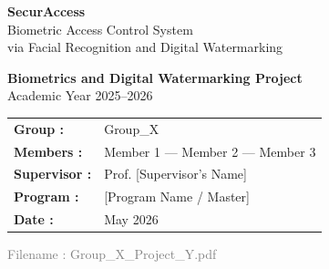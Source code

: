 \begin{titlepage}
    \centering
    \vspace*{1cm}

    {\Huge\bfseries\textcolor{mainblue}{SecurAccess}}\\[0.4cm]
    {\LARGE Biometric Access Control System\\via Facial Recognition and Digital Watermarking}

    \vspace{1.5cm}


    \vspace{1.5cm}

    {\Large\textbf{Biometrics and Digital Watermarking Project}}\\[0.5cm]
    {\large Academic Year 2025--2026}

    \vspace{2cm}

    \begin{tabular}{ll}
        \textbf{Group :}      & Group\_X \\[0.3cm]
        \textbf{Members :}    & Member 1 — Member 2 — Member 3 \\[0.3cm]
        \textbf{Supervisor :} & Prof. [Supervisor's Name] \\[0.3cm]
        \textbf{Program :}    & [Program Name / Master] \\[0.3cm]
        \textbf{Date :}       & May 2026 \\
    \end{tabular}

    \vspace{2cm}


    \vfill
    {\small\textcolor{gray}{Filename : Group\_X\_Project\_Y.pdf}}
\end{titlepage}
